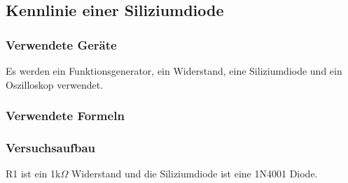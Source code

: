 \documentclass[12pt,a4paper]{article}
\begin{document}
\subsection{Kennlinie einer Siliziumdiode}
\subsubsection{Verwendete Geräte}

Es werden ein Funktionsgenerator, ein Widerstand, eine Siliziumdiode und ein Oszilloskop verwendet.

\subsubsection{Verwendete Formeln}
\subsubsection{Versuchsaufbau}

R1 ist ein 1k$\Omega$ Widerstand und die Siliziumdiode ist eine 1N4001 Diode.
\end{document}
